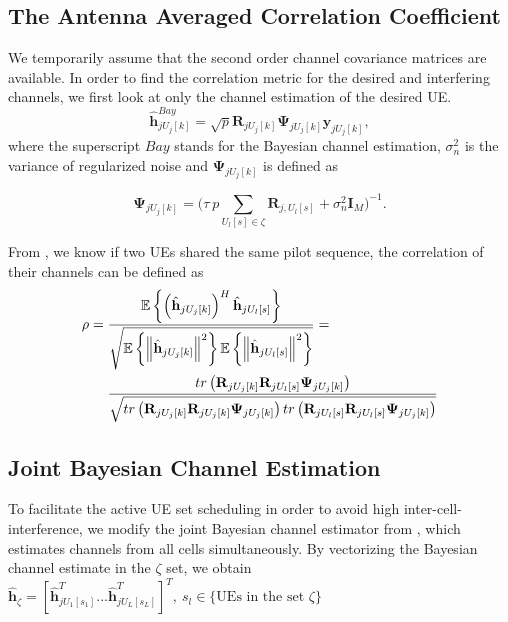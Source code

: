 \subsection{The Antenna Averaged Correlation Coefficient}
We temporarily assume that the second order channel covariance matrices are available. 
In order to find the correlation metric for the desired and interfering channels, we first look at only the channel estimation of the desired UE.
\begin{equation}
\hat{\mathbf{h}}^{Bay}_{jU_j[k]} = \sqrt{p}\mathbf{R}_{jU_j[k]} \mathbf{\Psi}_{jU_j[k]} \mathbf{y}_{jU_j[k]}, 
\end{equation}
where the superscript $Bay$ stands for the Bayesian channel estimation, $\sigma_{n}^{2}$ is the variance of regularized noise and $\mathbf{\Psi}_{jU_j[k]}$ is defined as

\begin{equation}
\mathbf{\Psi}_{jU_j[k]} = \Bigg(\tau\:{p}\sum_{U_l[s]\in\zeta} \mathbf{R}_{j,U_l[s]} + \sigma^2_n \mathbf{I}_M\Bigg)^{-1}.
\label{eq:psi_function}
\end{equation}

From \cite{bjornson2017massive}, we know if two UEs shared the same pilot sequence, the correlation of their channels can be defined as
\begin{equation}
\begin{split}
\rho={} &
\frac{\operatorname{\mathbb{E}}\left\{ \left(\hat{\mathbf{h}}_{jU_{j}[k]}\right)^{H}\hat{\mathbf{h}}_{jU_{l}[s]}\right\} }{\sqrt{\operatorname{\mathbb{E}}\left\{ \left\Vert \hat{\mathbf{h}}_{jU_{j}[k]}\right\Vert ^{2}\right\} \operatorname{\mathbb{E}}\left\{ \left\Vert \hat{\mathbf{h}}_{jU_{l}[s]}\right\Vert ^{2}\right\} }}=\\
& \frac{tr\left(\mathbf{R}_{jU_{j}[k]}\mathbf{R}_{jU_{l}[s]}\mathbf{\Psi}_{jU_{j}[k]}\right)}{\sqrt{tr\left(\mathbf{R}_{jU_{j}[k]}\mathbf{R}_{jU_{j}[k]}\mathbf{\Psi}_{jU_{j}[k]}\right)tr\left(\mathbf{R}_{jU_{l}[s]}\mathbf{R}_{jU_{l}[s]}\mathbf{\Psi}_{jU_{j}[k]}\right)}}
\end{split}
\end{equation}

\subsection{Joint Bayesian Channel Estimation}
To facilitate the active UE set scheduling in order to avoid high inter-cell-interference, we modify the joint Bayesian channel estimator from \cite{yin2013coordinated}, which estimates channels from all cells simultaneously. By vectorizing the Bayesian channel estimate in the $\zeta$ set, we obtain $\hat{\mathbf{h}}_{\zeta}=[\hat{\mathbf{h}}_{jU_{1}[s_{1}]}^{T}...\hat{\mathbf{h}}_{jU_{L}[s_{L}]}^{T}]^{T},\:s_{l}\in \{\text{UEs in the set } \zeta\}$ 


